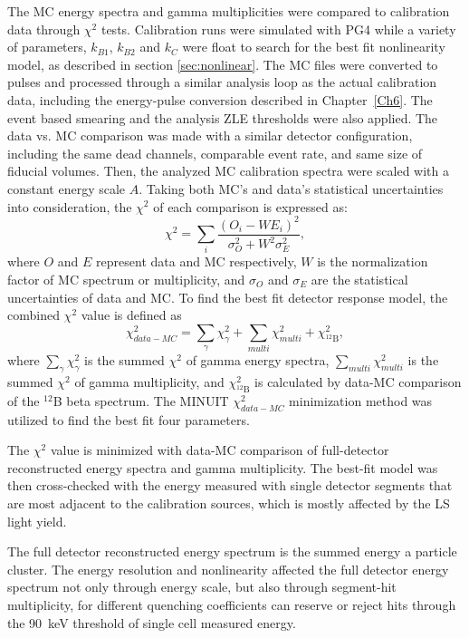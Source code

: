 The MC energy spectra and gamma multiplicities were compared to calibration data through $\chi^2$ tests. 
Calibration runs were simulated with PG4 while a variety of parameters, $k_{B1}$, $k_{B2}$ and $k_C$ were float to search for the best fit nonlinearity model, as described in section \ref{sec:nonlinear}. 
The MC files were converted to pulses and processed through a similar analysis loop as the actual calibration data, including the energy-pulse conversion described in Chapter~\ref{Ch6}.
The event based smearing and the analysis ZLE thresholds were also applied.
The data vs. MC comparison was made with a similar detector configuration, including the same dead channels, comparable event rate, and same size of fiducial volumes.
Then, the analyzed MC calibration spectra were scaled with a constant energy scale $A$.
Taking both MC's and data's statistical uncertainties into consideration, the $\chi^2$ of each comparison is expressed as:
\begin{equation}
	\chi^2 = \sum_i\frac{(O_i - WE_i)^2}{\sigma_O^2 + W^2\sigma_E^2},
\end{equation}
where $O$ and $E$ represent data and MC respectively, $W$ is the normalization factor of MC spectrum or multiplicity, and $\sigma_O$ and $\sigma_E$ are the statistical uncertainties of data and MC.
To find the best fit detector response model, the combined $\chi^2$ value is defined as
\begin{equation}
    \chi^2_{data-MC} = \sum_{\gamma} \chi^2_\gamma + \sum_{multi}\chi^2_{multi} + \chi^2_{^{12}\textrm{B}},
    \label{eq:escalechi2}
\end{equation}
where $\sum_{\gamma} \chi^2_\gamma$ is the summed $\chi^2$ of gamma energy spectra, $\sum_{multi} \chi^2_{multi}$ is the summed $\chi^2$ of gamma multiplicity, and $\chi^2_{^{12}\textrm{B}}$ is calculated by data-MC comparison of the $^{12}$B beta spectrum.
The MINUIT $\chi^2_{data-MC}$ minimization method was utilized to find the best fit four parameters. 

The $\chi^2$ value is minimized with data-MC comparison of full-detector reconstructed energy spectra and gamma multiplicity.
The best-fit model was then cross-checked with the energy measured with single detector segments that are most adjacent to the calibration sources, which is mostly affected by the LS light yield.

\label{sec:fulldet}
The full detector reconstructed energy spectrum is the summed energy a particle cluster. 
The energy resolution and nonlinearity affected the full detector energy spectrum not only through energy scale, but also through segment-hit multiplicity, for different quenching coefficients can reserve or reject hits through the 90~keV threshold of single cell measured energy.

